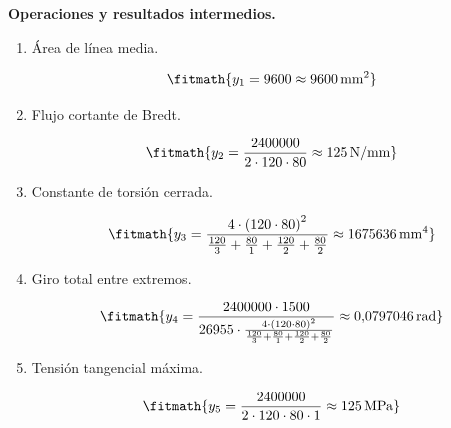 \noindent\textbf{Operaciones y resultados intermedios.}

\begin{enumerate}

\item Área de línea media.

\[\fitmath{y_{1}=9600\approx 9600\,\mathrm{mm^{2}}}\]

\item Flujo cortante de Bredt.

\[\fitmath{y_{2}=\frac{2400000}{2\cdot 120\cdot 80}\approx 125\,\mathrm{N/mm}}\]

\item Constante de torsión cerrada.

\[\fitmath{y_{3}=\frac{4\cdot {\left(120\cdot 80\right)}^{2}}{\frac{120}{3}+\frac{80}{1}+\frac{120}{2}+\frac{80}{2}}\approx 1675636\,\mathrm{mm^{4}}}\]

\item Giro total entre extremos.

\[\fitmath{y_{4}=\frac{2400000\cdot 1500}{26955\cdot \frac{4\cdot {\left(120\cdot 80\right)}^{2}}{\frac{120}{3}+\frac{80}{1}+\frac{120}{2}+\frac{80}{2}}}\approx 0{,}0797046\,\mathrm{rad}}\]

\item Tensión tangencial máxima.

\[\fitmath{y_{5}=\frac{2400000}{2\cdot 120\cdot 80\cdot 1}\approx 125\,\mathrm{MPa}}\]

\end{enumerate}
